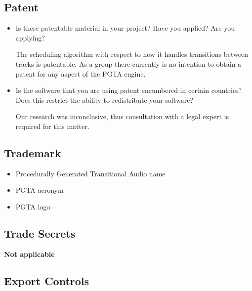 \documentclass{tufte-handout}
\begin{document}
\subsection{Patent} 

\begin{itemize}

    \item Is there patentable material in your project? Have you
    applied? Are you applying?

    The scheduling algorithm with respect to how it handles transitions between tracks is patentable. As a group there
    currently is no intention to obtain a patent for any aspect of the PGTA engine. 

    \item Is the software that you are using patent encumbered in certain
    countries? Does this restrict the ability to redistribute your
    software? 

    Our research was inconclusive, thus consultation with a legal expert is required for this matter. 

\end{itemize}

\subsection{Trademark}

\begin{itemize}
    \item Procedurally Generated Transitional Audio name 
    \item PGTA acronym
    \item PGTA logo
\end{itemize}

\subsection{Trade Secrets}

\textbf{Not applicable}

\subsection{Export Controls} 
\end{document}
